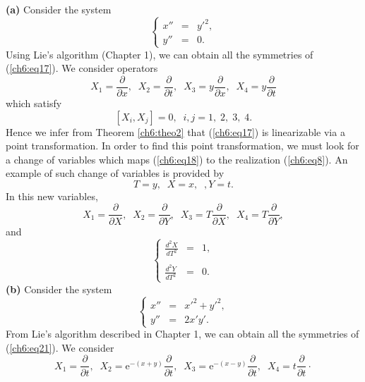 {\bf (a) } Consider the system
\begin{equation}
\label{ch6:eq17}
\left \{ \begin{array}{ccc}
x'' & = & y'^{2},\\
y'' & = & 0.
\end{array} \right.
\end{equation}
Using Lie's  algorithm (Chapter 1), we can obtain all the symmetries
of (\ref{ch6:eq17}). We consider operators
\begin{equation}
\label{ch6:eq18}
X_1=\frac{\partial}{\partial x},\;\;X_2=\frac{\partial}{\partial t},
\;\;X_3=y\frac{\partial}{\partial x},\;\;X_4=y\frac{\partial}{\partial t}
\end{equation}
which  satisfy
\[ [X_i,X_j]=0,\;\;i,j=1,\;2,\;3,\;4.\]
Hence we infer from Theorem \ref{ch6:theo2} that (\ref{ch6:eq17}) is linearizable via
a point transformation. In order to find this point transformation, we must
look for a change of variables which maps (\ref{ch6:eq18}) to the realization
(\ref{ch6:eq8}). An example of such change of variables is provided by
\[ T=y,\;\;X=x,\;\;,Y=t.\]
In this new variables,
\begin{equation}
\label{ch6:eq19}
X_1=\frac{\partial}{\partial X},\;\;X_2=\frac{\partial}{\partial Y},
\;\;X_3=T\frac{\partial}{\partial X},\;\;X_4=T\frac{\partial}{\partial Y},
\end{equation}
and
\begin{equation}
\label{ch6:eq20}
\left \{ \begin{array}{ccc}
\displaystyle{\frac{d^2X}{dT^2}} & = & 1,\\
& & \\
\displaystyle{\frac{d^2Y}{dT^2}} & = & 0.
\end{array} \right.
\end{equation}
{\bf (b)} Consider the system
\begin{equation}
\label{ch6:eq21}
\left \{ \begin{array}{ccc}
x'' &=& x'^{2}+y'^{2},\\
y'' &=& 2x'y'.
\end{array} \right.
\end{equation}
From Lie's algorithm  described in Chapter 1, we can obtain all 
the symmetries of (\ref{ch6:eq21}). We consider
\begin{equation}
\label{ch6:eq22}
X_1=\frac{\partial}{\partial t},\;\;X_2=\mbox{e}^{-(x+y)}\frac{\partial}
{\partial t},\;\;X_3=\mbox{e}^{-(x-y)}\frac{\partial}{\partial t},
\;\;X_4=t\frac{\partial}{\partial t}\cdot
\end{equation}
